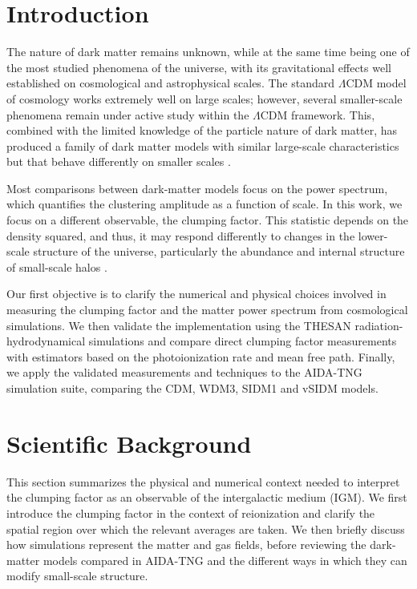 \documentclass[%
 reprint,
nofootinbib,
 amsmath,amssymb,
 aps,
]{revtex4-2}
\begin{document}
\date{\today}%


\section{Introduction}
The nature of dark matter remains unknown, while at the same time being one of the most studied phenomena of the universe, with its gravitational effects well established on cosmological and astrophysical scales. The standard $\Lambda$CDM model of cosmology works extremely well on large scales; however, several smaller-scale phenomena remain under active study within the $\Lambda$CDM framework. This, combined with the limited knowledge of the particle nature of dark matter, has produced a family of dark matter models with similar large-scale characteristics but that behave differently on smaller scales \cite{bullock2017smallscale}. 

Most comparisons between dark-matter models focus on the power spectrum, which quantifies the clustering amplitude as a function of scale. In this work, we focus on a different observable, the clumping factor. This statistic depends on the density squared, and thus, it may respond differently to changes in the lower-scale structure of the universe, particularly the abundance and internal structure of small-scale halos \cite{jing2005correcting}. 

Our first objective is to clarify the numerical and physical choices involved in measuring the clumping factor and the matter power spectrum from cosmological simulations. We then validate the implementation using the THESAN radiation-hydrodynamical simulations and compare direct clumping factor measurements with estimators based on the photoionization rate and mean free path. Finally, we apply the validated measurements and techniques to the AIDA-TNG simulation suite, comparing the CDM, WDM3, SIDM1 and vSIDM models.

\section{Scientific Background}

This section summarizes the physical and numerical context needed to interpret the clumping factor as an observable of the intergalactic medium (IGM). We first introduce the clumping factor in the context of reionization and clarify the spatial region over which the relevant averages are taken. We then briefly discuss how simulations represent the matter and gas fields, before reviewing the dark-matter models compared in AIDA-TNG and the different ways in which they can modify small-scale structure.
\end{document}
